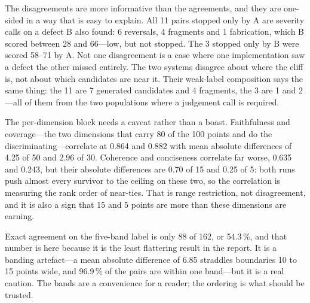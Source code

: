 \documentclass[conference]{IEEEtran}
\begin{document}
The disagreements are more informative than the agreements, and they are
one-sided in a way that is easy to explain. All 11 pairs stopped only by
A are severity calls on a defect B also found: 6 reversals, 4 fragments
and 1 fabrication, which B scored between 28 and 66---low, but not
stopped. The 3 stopped only by B were scored 58--71 by A. Not one
disagreement is a case where one implementation saw a defect the other
missed entirely. The two systems disagree about where the cliff is, not
about which candidates are near it. Their weak-label composition says
the same thing: the 11 are 7 generated candidates and 4 fragments, the 3
are 1 and 2---all of them from the two populations where a judgement
call is required.

The per-dimension block needs a caveat rather than a boast. Faithfulness
and coverage---the two dimensions that carry 80 of the 100 points and do
the discriminating---correlate at 0.864 and 0.882 with mean absolute
differences of 4.25 of 50 and 2.96 of 30. Coherence and conciseness
correlate far worse, 0.635 and 0.243, but their absolute differences are
0.70 of 15 and 0.25 of 5: both runs push almost every survivor to the
ceiling on these two, so the correlation is measuring the rank order of
near-ties. That is range restriction, not disagreement, and it is also a
sign that 15 and 5 points are more than these dimensions are earning.

Exact agreement on the five-band label is only 88 of 162, or 54.3\,\%,
and that number is here because it is the least flattering result in the
report. It is a banding artefact---a mean absolute difference of 6.85
straddles boundaries 10 to 15 points wide, and 96.9\,\% of the pairs are
within one band---but it is a real caution. The bands are a convenience
for a reader; the ordering is what should be trusted.
\end{document}
